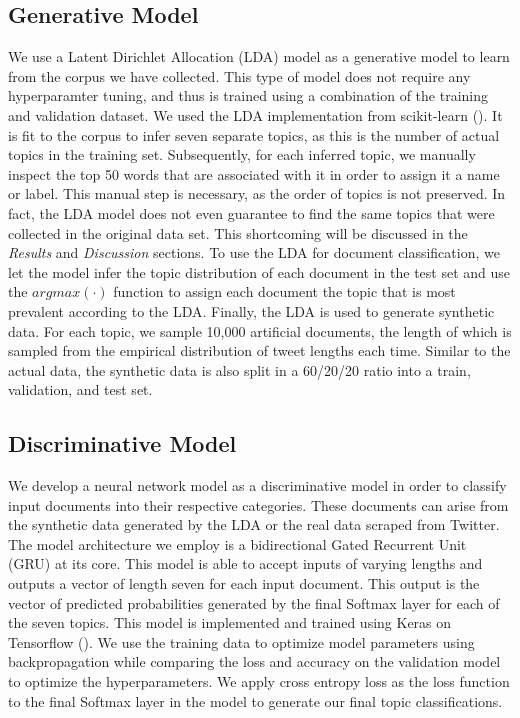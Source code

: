 \documentclass[11pt]{article}
\begin{document}
\subsection{Generative Model}
We use a Latent Dirichlet Allocation (LDA) model as a generative model to learn from the corpus we have collected. This type of model does not require any hyperparamter tuning, and thus is trained using a combination of the training and validation dataset. We used the LDA implementation from scikit-learn (\cite{sklearn}). It is fit to the corpus to infer seven separate topics, as this is the number of actual topics in the training set. Subsequently, for each inferred topic, we manually inspect the top 50 words that are associated with it in order to assign it a name or label. This manual step is necessary, as the order of topics is not preserved. In fact, the LDA model does not even guarantee to find the same topics that were collected in the original data set. This shortcoming will be discussed in the \emph{Results} and \emph{Discussion} sections. 
To use the LDA for document classification,  we let the model infer the topic distribution of each document in the test set and use the $argmax(\cdot)$ function to assign each document the topic that is most prevalent according to the LDA.
Finally, the LDA is used to generate synthetic data. For each topic, we sample 10,000 artificial documents, the length of which is sampled from the empirical distribution of tweet lengths each time. Similar to the actual data, the synthetic data is also split in a 60/20/20 ratio into a train, validation, and test set.


\subsection{Discriminative Model}
We develop a neural network model as a discriminative model in order to classify input documents into their respective categories. These documents can arise from the synthetic data generated by the LDA or the real data scraped from Twitter. The model architecture we employ is a bidirectional Gated Recurrent Unit (GRU) at its core. This model is able to accept inputs of varying lengths and outputs a vector of length seven for each input document. This output is the vector of predicted probabilities generated by the final Softmax layer for each of the seven topics. This model is implemented and trained using Keras on Tensorflow (\cite{tensorflow}). We use the training data to optimize model parameters using backpropagation while comparing the loss and accuracy on the validation model to optimize the hyperparameters. We apply cross entropy loss as the loss function to the final Softmax layer in the model to generate our final topic classifications.
\end{document}
